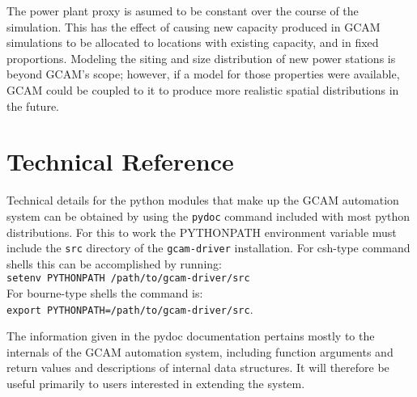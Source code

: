 \documentclass[11pt]{article}
\begin{document}
The power plant proxy is asumed to be constant over the course of the
simulation.  This has the effect of causing new capacity produced in
GCAM simulations to be allocated to locations with existing capacity,
and in fixed proportions.  Modeling the siting and size distribution
of new power stations is beyond GCAM's scope; however, if a model for
those properties were available, GCAM could be coupled to it to
produce more realistic spatial distributions in the future.

\appendix
\section{Technical Reference}
Technical details for the python modules that make up the GCAM
automation system can be obtained by using the \texttt{pydoc} command
included with most python distributions.  For this to work the
PYTHONPATH environment variable must include the \texttt{src}
directory of the \texttt{gcam-driver} installation.  For csh-type
command shells this can be accomplished by running:\\
\texttt{setenv PYTHONPATH /path/to/gcam-driver/src}\\
For bourne-type shells the command is:\\
\texttt{export PYTHONPATH=/path/to/gcam-driver/src}.

The information given in the pydoc documentation pertains mostly to
the internals of the GCAM automation system, including function
arguments and return values and descriptions of internal data
structures.  It will therefore be useful primarily to users interested
in extending the system.
\end{document}
